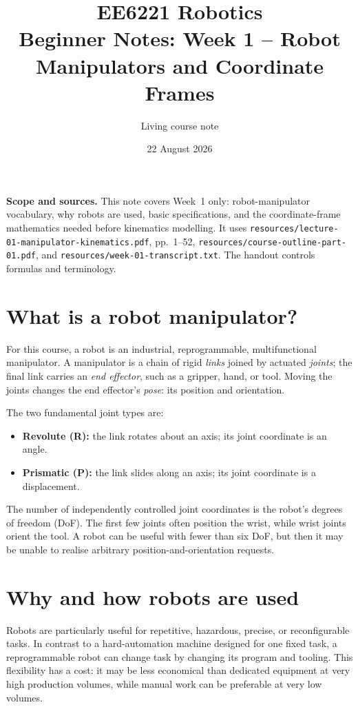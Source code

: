 \documentclass[11pt,a4paper]{article}
\title{EE6221 Robotics\\\large Beginner Notes: Week 1 -- Robot Manipulators and Coordinate Frames}
\author{Living course note}
\date{22 August 2026}
\renewcommand{\texttt}[1]{\nolinkurl{#1}}
\begin{document}
\maketitle
\noindent\textbf{Scope and sources.} This note covers Week~1 only: robot-manipulator vocabulary, why robots are used, basic specifications, and the coordinate-frame mathematics needed before kinematics modelling. It uses \texttt{resources/lecture-01-manipulator-kinematics.pdf}, pp.~1--52, \texttt{resources/course-outline-part-01.pdf}, and \texttt{resources/week-01-transcript.txt}. The handout controls formulas and terminology.
\tableofcontents

\section{\enspace What is a robot manipulator?}
For this course, a robot is an industrial, reprogrammable, multifunctional manipulator. A manipulator is a chain of rigid \emph{links} joined by actuated \emph{joints}; the final link carries an \emph{end effector}, such as a gripper, hand, or tool. Moving the joints changes the end effector's \emph{pose}: its position and orientation.

The two fundamental joint types are:
\begin{itemize}
\item \textbf{Revolute (R):} the link rotates about an axis; its joint coordinate is an angle.
\item \textbf{Prismatic (P):} the link slides along an axis; its joint coordinate is a displacement.
\end{itemize}
The number of independently controlled joint coordinates is the robot's degrees of freedom (DoF). The first few joints often position the wrist, while wrist joints orient the tool. A robot can be useful with fewer than six DoF, but then it may be unable to realise arbitrary position-and-orientation requests.

\section{\enspace Why and how robots are used}
Robots are particularly useful for repetitive, hazardous, precise, or reconfigurable tasks. In contrast to a hard-automation machine designed for one fixed task, a reprogrammable robot can change task by changing its program and tooling. This flexibility has a cost: it may be less economical than dedicated equipment at very high production volumes, while manual work can be preferable at very low volumes.
\end{document}

